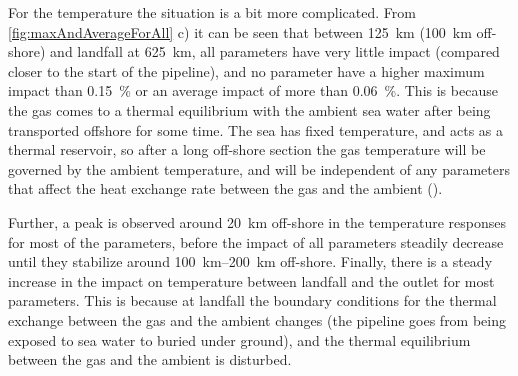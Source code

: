 % 

For the temperature the situation is a bit more complicated. From \cref{fig:maxAndAverageForAll} c) it can be seen that between \SI{125}{\kilo\meter} (\SI{100}{\kilo\meter} off-shore) and landfall at \SI{625}{\kilo\meter}, all parameters have very little impact (compared closer to the start of the pipeline), and no parameter have a higher maximum impact than \SI{0.15}{\percent} or an average impact of more than \SI{0.06}{\percent}. %
This is because the gas comes to a thermal equilibrium with the ambient sea water after being transported offshore for some time. The sea has fixed temperature, and acts as a thermal reservoir, so after a long off-shore section the gas temperature will be governed by the ambient temperature, and will be independent of any parameters that affect the heat exchange rate between the gas and the ambient ().

Further, a peak is observed around \SI{20}{\kilo\meter} off-shore in the temperature responses for most of the parameters, before the impact of all parameters steadily decrease until they stabilize around \SIrange{100}{200}{\kilo\meter} off-shore. Finally, there is a steady increase in the impact on temperature between landfall and the outlet for most parameters. This is because at landfall the boundary conditions for the thermal exchange between the gas and the ambient changes (the pipeline goes from being exposed to sea water to buried under ground), and the thermal equilibrium between the gas and the ambient is disturbed. %


